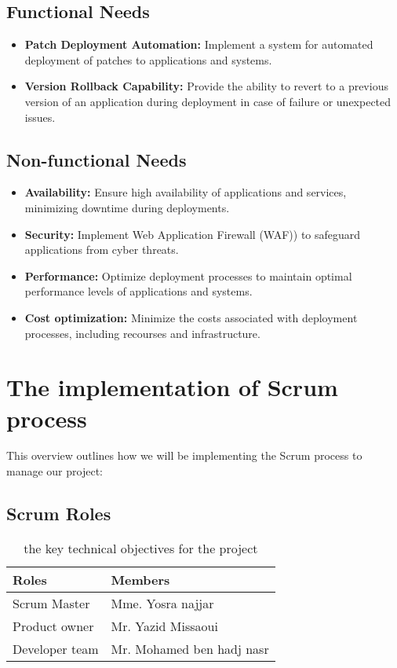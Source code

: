 \subsection{Functional Needs}
\begin{itemize}
    \item \textbf{Patch Deployment Automation:} Implement a system for automated deployment of patches to applications and systems.
    \item \textbf{Version Rollback Capability:} Provide the ability to revert to a previous version of an application during deployment in case of failure or unexpected issues.
\end{itemize}
\subsection{Non-functional Needs}
\noindent
\begin{itemize}
    \item \textbf{Availability:} Ensure high availability of applications and services, minimizing downtime during deployments.
    \item \textbf{Security:} Implement Web Application Firewall (WAF)) to safeguard applications from cyber threats.
    \item \textbf{Performance:} Optimize deployment processes to maintain optimal performance levels of applications and systems.
    \item \textbf{Cost optimization:} Minimize the costs associated with deployment processes, including recourses and infrastructure.
\end{itemize}

\section{The implementation of Scrum process}
This overview outlines how we will be implementing the Scrum process to manage our project:

\subsection{Scrum Roles}
\begin{longtable}[c]{
    |p{}
    |p{}|
    }
    \caption{the key technical objectives for the project}
    \label{tab:Scrum-team}                     \\
    \hline
    Roles          & Members                   \\ \hline
    Scrum Master   & Mme. Yosra najjar         \\ \hline
    Product owner  & Mr. Yazid Missaoui        \\ \hline
    Developer team & Mr. Mohamed ben hadj nasr \\ \hline
\end{longtable}

